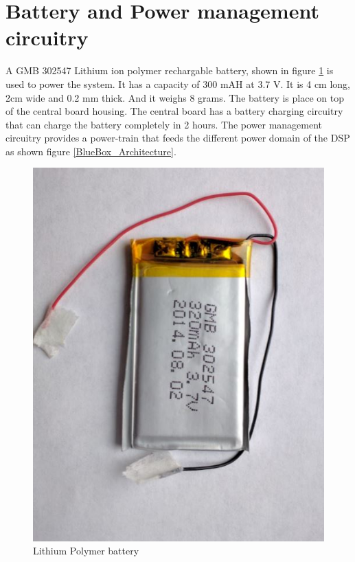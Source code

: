 \section{Battery and Power management circuitry}
 A GMB 302547 Lithium ion polymer rechargable battery, shown in figure \ref{fig:battery} is used to power the system. It has a capacity of 300 mAH at 3.7 V. It is 4 cm long, 2cm wide and 0.2 mm thick. And it weighs 8 grams. The battery is place on top of the central board housing. The central board has a battery charging circuitry that can charge the battery completely in 2 hours. The power management circuitry provides a power-train that feeds the different power domain of the DSP as shown figure \ref{BlueBox_Architecture}.
 \begin{figure}[h]
 	\centering
 	\includegraphics[scale = 0.25 ]{battery.JPG}
 	\caption{Lithium Polymer battery}\label{fig:battery}
 \end{figure}      


